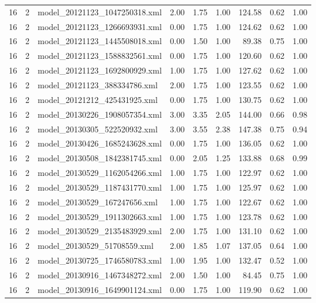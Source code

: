 \begin{table}[ht]
\begin{tabular}{rrlrrrrrr}
   16 &   2 & model\_20121123\_1047250318.xml & 2.00 & 1.75 & 1.00 & 124.58 & 0.62 & 1.00 \\ 
   16 &   2 & model\_20121123\_1266693931.xml & 0.00 & 1.75 & 1.00 & 124.62 & 0.62 & 1.00 \\ 
   16 &   2 & model\_20121123\_1445508018.xml & 0.00 & 1.50 & 1.00 & 89.38 & 0.75 & 1.00 \\ 
   16 &   2 & model\_20121123\_1588832561.xml & 0.00 & 1.75 & 1.00 & 120.60 & 0.62 & 1.00 \\ 
   16 &   2 & model\_20121123\_1692800929.xml & 1.00 & 1.75 & 1.00 & 127.62 & 0.62 & 1.00 \\ 
   16 &   2 & model\_20121123\_388334786.xml & 2.00 & 1.75 & 1.00 & 123.55 & 0.62 & 1.00 \\ 
   16 &   2 & model\_20121212\_425431925.xml & 0.00 & 1.75 & 1.00 & 130.75 & 0.62 & 1.00 \\ 
   16 &   2 & model\_20130226\_1908057354.xml & 3.00 & 3.35 & 2.05 & 144.00 & 0.66 & 0.98 \\ 
   16 &   2 & model\_20130305\_522520932.xml & 3.00 & 3.55 & 2.38 & 147.38 & 0.75 & 0.94 \\ 
   16 &   2 & model\_20130426\_1685243628.xml & 0.00 & 1.75 & 1.00 & 136.05 & 0.62 & 1.00 \\ 
   16 &   2 & model\_20130508\_1842381745.xml & 0.00 & 2.05 & 1.25 & 133.88 & 0.68 & 0.99 \\ 
   16 &   2 & model\_20130529\_1162054266.xml & 1.00 & 1.75 & 1.00 & 122.97 & 0.62 & 1.00 \\ 
   16 &   2 & model\_20130529\_1187431770.xml & 1.00 & 1.75 & 1.00 & 125.97 & 0.62 & 1.00 \\ 
   16 &   2 & model\_20130529\_167247656.xml & 1.00 & 1.75 & 1.00 & 122.67 & 0.62 & 1.00 \\ 
   16 &   2 & model\_20130529\_1911302663.xml & 1.00 & 1.75 & 1.00 & 123.78 & 0.62 & 1.00 \\ 
   16 &   2 & model\_20130529\_2135483929.xml & 2.00 & 1.75 & 1.00 & 131.10 & 0.62 & 1.00 \\ 
   16 &   2 & model\_20130529\_51708559.xml & 2.00 & 1.85 & 1.07 & 137.05 & 0.64 & 1.00 \\ 
   16 &   2 & model\_20130725\_1746580783.xml & 1.00 & 1.95 & 1.00 & 132.47 & 0.52 & 1.00 \\ 
   16 &   2 & model\_20130916\_1467348272.xml & 2.00 & 1.50 & 1.00 & 84.45 & 0.75 & 1.00 \\ 
   16 &   2 & model\_20130916\_1649901124.xml & 0.00 & 1.75 & 1.00 & 119.90 & 0.62 & 1.00 \\ 

\end{tabular}
\end{table}
